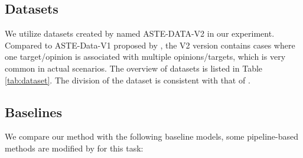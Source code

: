 \documentclass[11pt]{article}
\begin{document}
\subsection{Datasets}
We utilize datasets created by \cite{xu2020position} named ASTE-DATA-V2 in our experiment. Compared to ASTE-Data-V1 proposed by \cite{peng2020knowing}, the V2 version contains cases where one target/opinion is associated with multiple opinions/targets, which is very common in actual scenarios.
The overview of datasets is listed in Table \ref{tab:dataset}. The division of the dataset is consistent with that of \cite{xu2020position}.
\subsection{Baselines}
We compare our method with the following baseline models, some pipeline-based methods are modified by \cite{peng2020knowing} for this task:
\end{document}
